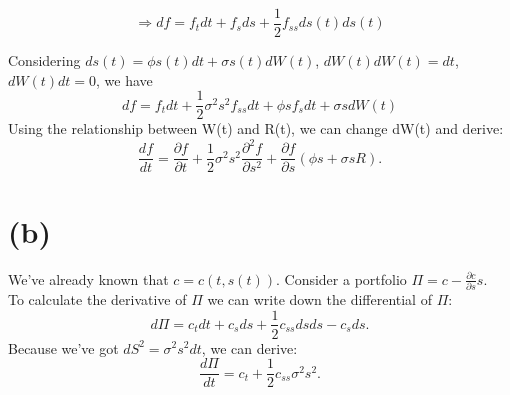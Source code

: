 \documentclass[12pt,a4paper]{paper}
\begin{document}
\begin{equation}
\Longrightarrow df = f_t dt + f_s ds + \frac{1}{2} f_{ss} ds(t)ds(t)
\end{equation}

\indent Considering $ds(t) = \phi s(t) dt + \sigma s(t) dW(t)$, $dW(t)dW(t) = dt$, $dW(t) dt = 0$, we have 
\begin{equation}
df = f_t dt + \frac{1}{2}\sigma^2s^2f_{ss}dt + \phi s f_s dt + \sigma s dW(t)
\end{equation}
\indent Using the relationship between W(t) and R(t), we can change dW(t) and derive:
\begin{equation}
\frac{df}{dt}=\frac{\partial f}{\partial t}+\frac{1}{2}\sigma ^{2}s^{2}\frac{\partial^2 f}{\partial s^2}+\frac{\partial f}{\partial s}(\phi s+\sigma sR).
\end{equation}

\section{(b)}
\indent We've already known that $c = c(t, s(t))$. Consider a portfolio $\Pi=c-\frac{\partial c}{\partial s}s$.\\
\indent To calculate the derivative of $\Pi$ we can write down the differential of $\Pi$:
\begin{equation}
d\Pi = c_t dt + c_s ds + \frac{1}{2}c_{ss} ds ds - c_s ds.
\end{equation}
\indent Because we've got $dS^2={\sigma}^{2} s^{2}dt$, we can derive:
\begin{equation}
\frac{d\Pi}{dt}= c_t + \frac{1}{2} c_{ss} \sigma^2 s^2.
\end{equation}
\end{document}
